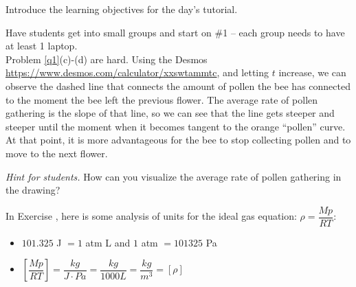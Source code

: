 Introduce the learning objectives for the day's tutorial.

Have students get into small groups and start on \#1 -- each group needs to have at least 1 laptop. \\

Problem \ref{q1}(c)-(d) are hard. Using the Desmos \url{https://www.desmos.com/calculator/xxswtammtc}, and letting $t$ increase, we can observe the dashed line that connects the amount of pollen the bee has connected to the moment the bee left the previous flower.
The average rate of pollen gathering is the slope of that line, so we can see that the line gets steeper and steeper until the moment when it becomes tangent to the orange ``pollen'' curve. At that point, it is more advantageous for the bee to stop collecting pollen and to move to the next flower.

\textit{Hint for students. } How can you visualize the average rate of pollen gathering in the drawing? 


	
\hfill 



In Exercise \label{q2}, here is some analysis of units for the ideal gas equation: $\rho = \dfrac{Mp}{RT}$:

\begin{itemize}
	\item $101.325$ J $  = 1$ atm L \quad and \quad $1$ atm $= 101325$ Pa
	\item $\left[\dfrac{Mp}{RT}\right] = \dfrac{kg}{J \cdot Pa} = \dfrac{kg}{1000 L} = \dfrac{kg}{m^3} = [\rho]$
\end{itemize}



%
%	
%	
%	
%	
%		
%			
%	




%
	
	

	
	
